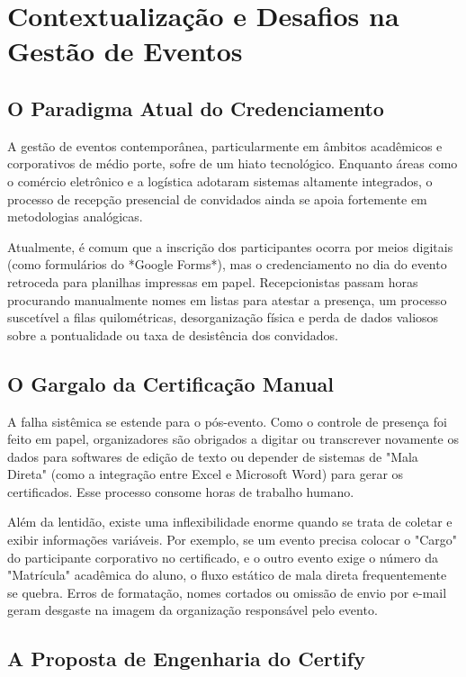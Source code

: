 \chapter{Contextualização e Desafios na Gestão de Eventos}

\section{O Paradigma Atual do Credenciamento}

A gestão de eventos contemporânea, particularmente em âmbitos acadêmicos e corporativos de médio porte, sofre de um hiato tecnológico. Enquanto áreas como o comércio eletrônico e a logística adotaram sistemas altamente integrados, o processo de recepção presencial de convidados ainda se apoia fortemente em metodologias analógicas. 

Atualmente, é comum que a inscrição dos participantes ocorra por meios digitais (como formulários do *Google Forms*), mas o credenciamento no dia do evento retroceda para planilhas impressas em papel. Recepcionistas passam horas procurando manualmente nomes em listas para atestar a presença, um processo suscetível a filas quilométricas, desorganização física e perda de dados valiosos sobre a pontualidade ou taxa de desistência dos convidados.

\section{O Gargalo da Certificação Manual}

A falha sistêmica se estende para o pós-evento. Como o controle de presença foi feito em papel, organizadores são obrigados a digitar ou transcrever novamente os dados para softwares de edição de texto ou depender de sistemas de "Mala Direta" (como a integração entre Excel e Microsoft Word) para gerar os certificados. Esse processo consome horas de trabalho humano.

Além da lentidão, existe uma inflexibilidade enorme quando se trata de coletar e exibir informações variáveis. Por exemplo, se um evento precisa colocar o "Cargo" do participante corporativo no certificado, e o outro evento exige o número da "Matrícula" acadêmica do aluno, o fluxo estático de mala direta frequentemente se quebra. Erros de formatação, nomes cortados ou omissão de envio por e-mail geram desgaste na imagem da organização responsável pelo evento.

\section{A Proposta de Engenharia do Certify}

